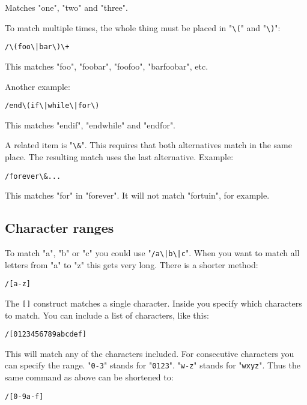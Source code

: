 Matches "one", "two" and "three".

To match multiple times, the whole thing must be placed in "\texttt{\textbackslash{}(}" and "\texttt{\textbackslash{})}":

\begin{Verbatim}[samepage=true]
 /\(foo\|bar\)\+
\end{Verbatim}

This matches "foo", "foobar", "foofoo", "barfoobar", etc.

Another example:

\begin{Verbatim}[samepage=true]
 /end\(if\|while\|for\)
\end{Verbatim}

This matches "endif", "endwhile" and "endfor".

A related item is "\texttt{\textbackslash{}\&}".
This requires that both alternatives match in the same place.
The resulting match uses the last alternative.
Example:

\begin{Verbatim}[samepage=true]
 /forever\&...
\end{Verbatim}

This matches "for" in "forever".  It will not match "fortuin", for example.
\subsection{Character ranges}
To match "a", "b" or "c" you could use "\texttt{/a\textbackslash{}|b\textbackslash{}|c}".
When you want to match all letters from "a" to "z" this gets very long.
There is a shorter method:

\begin{Verbatim}[samepage=true]
 /[a-z]
\end{Verbatim}

The \texttt{[]} construct matches a single character.
Inside you specify which characters to match.
You can include a list of characters, like this:

\begin{Verbatim}[samepage=true]
 /[0123456789abcdef]
\end{Verbatim}

This will match any of the characters included.
For consecutive characters you can specify the range.
"\texttt{0-3}" stands for "\texttt{0123}".
"\texttt{w-z}" stands for "\texttt{wxyz}".
Thus the same command as above can be shortened to:

\begin{Verbatim}[samepage=true]
 /[0-9a-f]
\end{Verbatim}

